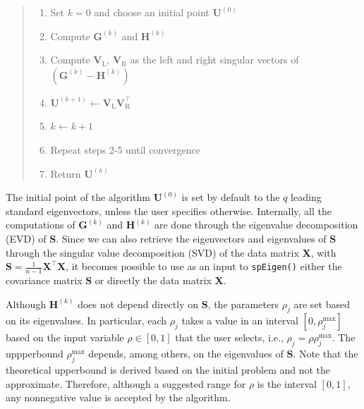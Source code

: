 \documentclass[]{article}
\providecommand{\tightlist}{%
  \setlength{\itemsep}{0pt}\setlength{\parskip}{0pt}}
\begin{document}
\begin{quote}
\begin{enumerate}
\def\labelenumi{\arabic{enumi}.}
\tightlist
\item
  Set \(k=0\) and choose an initial point \(\mathbf{U}^{(0)}\)\\
\item
  Compute \(\mathbf{G}^{(k)}\) and \(\mathbf{H}^{(k)}\)\\
\item
  Compute \(\mathbf{V}_{\text{L}}\), \(\mathbf{V}_{\text{R}}\) as the
  left and right singular vectors of
  \(\left(\mathbf{G}^{(k)} - \mathbf{H}^{(k)}\right)\)\\
\item
  \(\mathbf{U}^{(k+1)} \gets \mathbf{V}_{\text{L}}\mathbf{V}_{\text{R}}^\top\)\\
\item
  \(k \gets k+1\)\\
\item
  Repeat steps 2-5 until convergence\\
\item
  Return \(\mathbf{U}^{(k)}\)
\end{enumerate}
\end{quote}

The initial point of the algorithm \(\mathbf{U}^{(0)}\) is set by
default to the \(q\) leading standard eigenvectors, unless the user
specifies otherwise. Internally, all the computations of
\(\mathbf{G}^{(k)}\) and \(\mathbf{H}^{(k)}\) are done through the
eigenvalue decomposition (EVD) of \(\mathbf{S}\). Since we can also
retrieve the eigenvectors and eigenvalues of \(\mathbf{S}\) through the
singular value decomposition (SVD) of the data matrix \(\mathbf{X}\),
with \(\mathbf{S} = \frac{1}{n-1}\mathbf{X}^\top\mathbf{X}\), it becomes
possible to use as an input to \texttt{spEigen()} either the covariance
matrix \(\mathbf{S}\) or directly the data matrix \(\mathbf{X}\).

Although \(\mathbf{H}^{(k)}\) does not depend directly on
\(\mathbf{S}\), the parameters \(\rho_j\) are set based on its
eigenvalues. In particular, each \(\rho_j\) takes a value in an interval
\([0, \rho_j^{\text{max}}]\) based on the input variable
\(\rho\in[0, 1]\) that the user selects, i.e.,
\(\rho_j = \rho\rho_j^{\text{max}}\). The uppperbound
\(\rho_j^{\text{max}}\) depends, among others, on the eigenvalues of
\(\mathbf{S}\). Note that the theoretical upperbound is derived based on
the initial problem and not the approximate. Therefore, although a
suggested range for \(\rho\) is the interval \([0, 1]\), any nonnegative
value is accepted by the algorithm.
\end{document}
